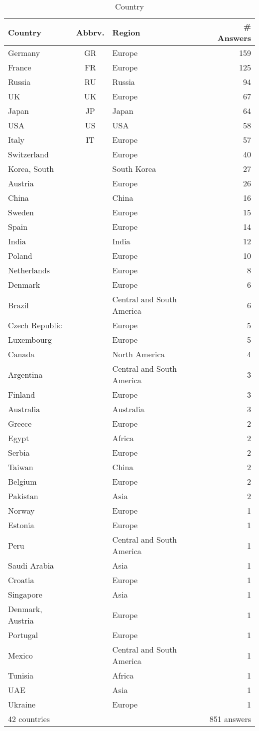 \begin{table}[htb]%
\begin{center}%
\caption{Country}\label{tab:countries}%
\begin{tabular}{l|c|l|r}%
\hline%
Country & Abbrv. & Region & \# Answers \\%
\hline%
Germany&GR&Europe&159\\%
France&FR&Europe&125\\%
Russia&RU&Russia&94\\%
UK&UK&Europe&67\\%
Japan&JP&Japan&64\\%
USA&US&USA&58\\%
Italy&IT&Europe&57\\%
\hline%
Switzerland&&Europe&40\\%
Korea, South&&South Korea&27\\%
Austria&&Europe&26\\%
China&&China&16\\%
Sweden&&Europe&15\\%
Spain&&Europe&14\\%
India&&India&12\\%
Poland&&Europe&10\\%
Netherlands&&Europe&8\\%
Denmark&&Europe&6\\%
Brazil&&Central and South America&6\\%
Czech Republic&&Europe&5\\%
Luxembourg&&Europe&5\\%
Canada&&North America&4\\%
Argentina&&Central and South America&3\\%
Finland&&Europe&3\\%
Australia&&Australia&3\\%
Greece&&Europe&2\\%
Egypt&&Africa&2\\%
Serbia&&Europe&2\\%
Taiwan&&China&2\\%
Belgium&&Europe&2\\%
Pakistan&&Asia&2\\%
Norway&&Europe&1\\%
Estonia&&Europe&1\\%
Peru&&Central and South America&1\\%
Saudi Arabia&&Asia&1\\%
Croatia&&Europe&1\\%
Singapore&&Asia&1\\%
Denmark, Austria&&Europe&1\\%
Portugal&&Europe&1\\%
Mexico&&Central and South America&1\\%
Tunisia&&Africa&1\\%
UAE&&Asia&1\\%
Ukraine&&Europe&1\\%
\hline%
42 countries & & & 851 answers \\%
\hline%
\end{tabular}%
\end{center}%
\end{table}%
